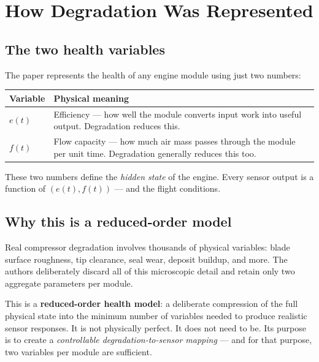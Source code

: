 \documentclass[11pt, a4paper]{article}
\begin{document}
\section{How Degradation Was Represented}

\subsection{The two health variables}

The paper represents the health of any engine module using just two
numbers:

\begin{center}
\begin{tabular}{@{}lp{9cm}@{}}
  \toprule
  Variable & Physical meaning \\
  \midrule
  $e(t)$ & Efficiency --- how well the module converts input work into
           useful output. Degradation reduces this. \\
  $f(t)$ & Flow capacity --- how much air mass passes through the module
           per unit time. Degradation generally reduces this too. \\
  \bottomrule
\end{tabular}
\end{center}

These two numbers define the \emph{hidden state} of the engine.
Every sensor output is a function of $(e(t), f(t))$ --- and the
flight conditions.

\subsection{Why this is a reduced-order model}

Real compressor degradation involves thousands of physical variables:
blade surface roughness, tip clearance, seal wear, deposit buildup,
and more. The authors deliberately discard all of this microscopic
detail and retain only two aggregate parameters per module.

This is a \textbf{reduced-order health model}: a deliberate compression
of the full physical state into the minimum number of variables needed
to produce realistic sensor responses. It is not physically perfect.
It does not need to be. Its purpose is to create a
\emph{controllable degradation-to-sensor mapping} --- and for that
purpose, two variables per module are sufficient.
\end{document}
